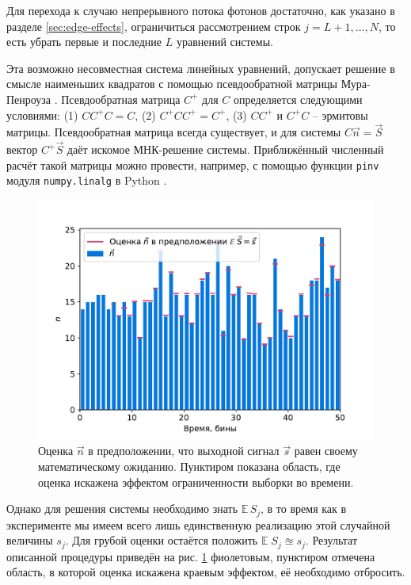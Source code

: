 \documentclass[12pt]{book}
\begin{document}
	Для перехода к случаю непрерывного потока фотонов достаточно, как указано в разделе \ref{sec:edge-effects}, ограничиться рассмотрением строк $j = L+1, \ldots, N$, то есть убрать первые и последние $L$ уравнений системы.

	Эта возможно несовместная система линейных уравнений, допускает решение в смысле наименьших квадратов с помощью псевдообратной матрицы Мура-Пенроуза \cite{Penrose1956}. Псевдообратная матрица $C^+$ для $C$ определяется следующими условиями: (1) $C C^+ C = C$, (2) $C^+ C C^+ = C^+$, (3) $C C^+$ и $C^+ C$ -- эрмитовы матрицы. Псевдообратная матрица всегда существует, и для системы $C\vec{n} = \vec{S}$ вектор $C^+ \vec{S}$ даёт искомое МНК-решение системы. Приближённый численный расчёт такой матрицы можно провести, например, с помощью функции \verb|pinv| модуля \verb|numpy.linalg| в Python \cite{Harris2020}.

	\begin{figure}[H]
		\centering
		\includegraphics[width=\columnwidth]{mean-estimation}
		\caption{Оценка $\vec{n}$ в предположении, что выходной сигнал $\vec{s}$ равен своему математическому ожиданию. Пунктиром показана область, где оценка искажена эффектом ограниченности выборки во времени.}
		\label{pic:mean-estimation}
	\end{figure}
	
	Однако для решения системы необходимо знать $\mathbb{E} \, S_j$, в то время как в эксперименте мы имеем всего лишь единственную реализацию этой случайной величины $s_j$. Для грубой оценки остаётся положить $\mathbb{E} \; S_j \approxeq s_j$. Результат описанной процедуры приведён на рис. \ref{pic:mean-estimation} фиолетовым, пунктиром отмечена область, в которой оценка искажена краевым эффектом, её необходимо отбросить.
	
\end{document}
